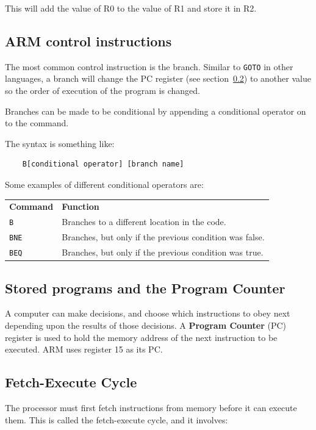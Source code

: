 This will add the value of R0 to the value of R1 and store it in R2.

\subsection{ARM control instructions}

The most common control instruction is the branch. Similar to \texttt{GOTO} in
other languages, a branch will change the PC register (see
section~\ref{subsec:pc}) to another value so the order of execution of the
program is changed.

Branches can be made to be conditional by appending a conditional operator on to
the command.

The syntax is something like:

\begin{verbatim}
	B[conditional operator]	[branch name]
\end{verbatim}

Some examples of different conditional operators are:

\begin{tabularx}{\textwidth}{l X}
	{\bf Command} & {\bf Function}\\
	\texttt{B} & Branches to a different location in the code.\\
	\texttt{BNE} & Branches, but only if the previous condition was false.\\
	\texttt{BEQ} & Branches, but only if the previous condition was true.\\
\end{tabularx}

\subsection{Stored programs and the Program Counter}
\label{subsec:pc}

A computer can make decisions, and choose which instructions to obey next
depending upon the results of those decisions. A {\bf Program Counter} (PC)
register is used to hold the memory address of the next instruction to be
executed. ARM uses register 15 as its PC.

\subsection{Fetch-Execute Cycle}

The processor must first fetch instructions from memory before it can execute them. This is called the fetch-execute cycle, and it involves:

